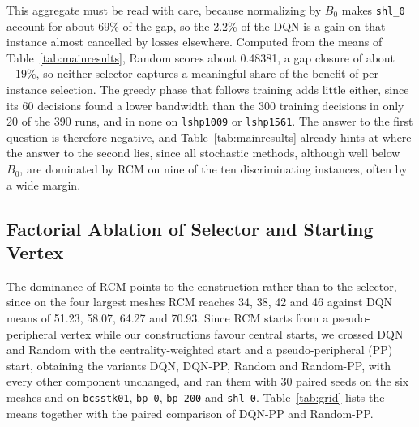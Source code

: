 \documentclass[runningheads]{llncs}
\begin{document}
This aggregate must be read with care, because normalizing by $B_0$ makes \texttt{shl\_0} account for about 69\% of the gap, so the 2.2\% of the DQN is a gain on that instance almost cancelled by losses elsewhere. Computed from the means of Table~\ref{tab:mainresults}, Random scores about 0.48381, a gap closure of about $-19\%$, so neither selector captures a meaningful share of the benefit of per-instance selection. The greedy phase that follows training adds little either, since its 60 decisions found a lower bandwidth than the 300 training decisions in only 20 of the 390 runs, and in none on \texttt{lshp1009} or \texttt{lshp1561}. The answer to the first question is therefore negative, and Table~\ref{tab:mainresults} already hints at where the answer to the second lies, since all stochastic methods, although well below $B_0$, are dominated by RCM on nine of the ten discriminating instances, often by a wide margin.

\subsection{Factorial Ablation of Selector and Starting Vertex}
\label{sec:ablation}

The dominance of RCM points to the construction rather than to the selector, since on the four largest meshes RCM reaches 34, 38, 42 and 46 against DQN means of 51.23, 58.07, 64.27 and 70.93. Since RCM starts from a pseudo-peripheral vertex while our constructions favour central starts, we crossed DQN and Random with the centrality-weighted start and a pseudo-peripheral (PP) start, obtaining the variants DQN, DQN-PP, Random and Random-PP, with every other component unchanged, and ran them with 30 paired seeds on the six meshes and on \texttt{bcsstk01}, \texttt{bp\_0}, \texttt{bp\_200} and \texttt{shl\_0}. Table~\ref{tab:grid} lists the means together with the paired comparison of DQN-PP and Random-PP.
\end{document}
